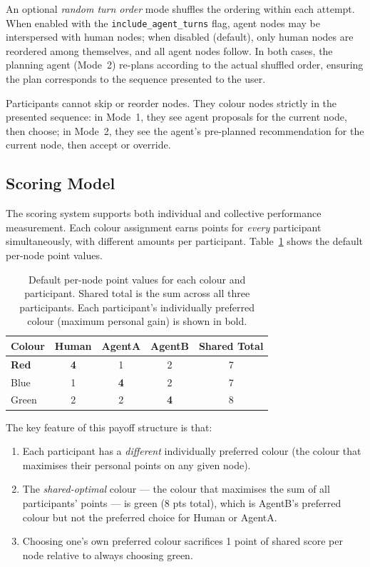 \documentclass[11pt]{article}
\theoremstyle{definition}
\newcommand{\Human}{\textsf{Human}}
\newcommand{\AgentA}{\textsf{AgentA}}
\newcommand{\AgentB}{\textsf{AgentB}}
\begin{document}
An optional \emph{random turn order} mode shuffles the ordering within each attempt.
When enabled with the \texttt{include\_agent\_turns} flag, agent nodes may be
interspersed with human nodes; when disabled (default), only human nodes are reordered
among themselves, and all agent nodes follow.  In both cases, the planning agent
(Mode~2) re-plans according to the actual shuffled order, ensuring the plan corresponds
to the sequence presented to the user.

Participants cannot skip or reorder nodes.  They colour nodes strictly in the presented
sequence: in Mode~1, they see agent proposals for the current node, then choose; in
Mode~2, they see the agent's pre-planned recommendation for the current node, then
accept or override.

\subsection{Scoring Model}
\label{sec:scoring}

The scoring system supports both individual and collective performance measurement.
Each colour assignment earns points for \emph{every} participant simultaneously, with
different amounts per participant.  Table~\ref{tab:default_points} shows the default
per-node point values.

\begin{table}[h]
\centering
\caption{Default per-node point values for each colour and participant.
         Shared total is the sum across all three participants.
         Each participant's individually preferred colour (maximum personal gain) is shown in bold.}
\label{tab:default_points}
\begin{tabular}{lcccc}
\toprule
\textbf{Colour} & \textbf{Human} & \textbf{AgentA} & \textbf{AgentB} & \textbf{Shared Total} \\
\midrule
\textbf{Red}   & \textbf{4}    & 1              & 2               & 7 \\
Blue            & 1             & \textbf{4}     & 2               & 7 \\
Green           & 2             & 2              & \textbf{4}      & 8 \\
\bottomrule
\end{tabular}
\end{table}

The key feature of this payoff structure is that:
\begin{enumerate}[nosep]
  \item Each participant has a \emph{different} individually preferred colour (the colour
    that maximises their personal points on any given node).
  \item The \emph{shared-optimal} colour --- the colour that maximises the sum of all
    participants' points --- is green (8 pts total), which is \AgentB's preferred colour
    but not the preferred choice for \Human{} or \AgentA.
  \item Choosing one's own preferred colour sacrifices 1 point of shared score per node
    relative to always choosing green.
\end{enumerate}
\end{document}
